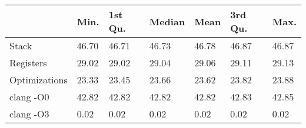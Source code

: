 \begin{table}[ht]
\centering
\begin{tabular}{p{}p{}p{}p{}p{}p{}p{}}
  \hline
 & Min. & 1st Qu. & Median & Mean & 3rd Qu. & Max. \\ 
  \hline
Stack & 46.70 & 46.71 & 46.73 & 46.78 & 46.87 & 46.87 \\ 
  Registers & 29.02 & 29.02 & 29.04 & 29.06 & 29.11 & 29.13 \\ 
  Optimizations & 23.33 & 23.45 & 23.66 & 23.62 & 23.82 & 23.88 \\ 
  clang -O0 & 42.82 & 42.82 & 42.82 & 42.82 & 42.83 & 42.85 \\ 
  clang -O3 & 0.02 & 0.02 & 0.02 & 0.02 & 0.02 & 0.02 \\ 
   \hline
\end{tabular}
\end{table}

